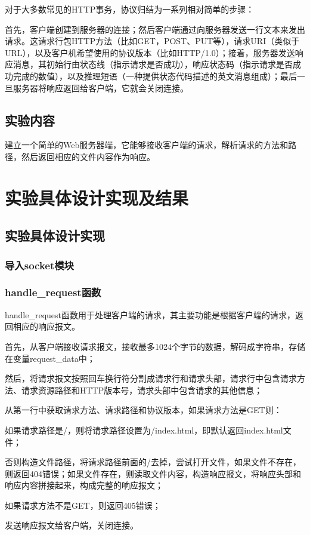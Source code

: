 \documentclass[UTF8,12pt]{article}
\begin{document}
对于大多数常见的HTTP事务，协议归结为一系列相对简单的步骤：

首先，客户端创建到服务器的连接；然后客户端通过向服务器发送一行文本来发出请求。这请求行包HTTP方法（比如GET，POST、PUT等），请求URI（类似于URL），以及客户机希望使用的协议版本（比如HTTP/1.0）；接着，服务器发送响应消息，其初始行由状态线（指示请求是否成功），响应状态码（指示请求是否成功完成的数值），以及推理短语（一种提供状态代码描述的英文消息组成）；最后一旦服务器将响应返回给客户端，它就会关闭连接。

\subsection{实验内容}
建立一个简单的Web服务器端，它能够接收客户端的请求，解析请求的方法和路径，然后返回相应的文件内容作为响应。
\section{实验具体设计实现及结果}
\subsection{实验具体设计实现}
\subsubsection{导入socket模块}
\subsubsection{handle\_request函数}
handle\_request函数用于处理客户端的请求，其主要功能是根据客户端的请求，返回相应的响应报文。

首先，从客户端接收请求报文，接收最多1024个字节的数据，解码成字符串，存储在变量request\_data中；

然后，将请求报文按照回车换行符分割成请求行和请求头部，请求行中包含请求方法、请求资源路径和HTTP版本号，请求头部中包含请求的其他信息；

从第一行中获取请求方法、请求路径和协议版本，如果请求方法是GET则：

如果请求路径是/，则将请求路径设置为/index.html，即默认返回index.html文件；

否则构造文件路径，将请求路径前面的/去掉，尝试打开文件，如果文件不存在，则返回404错误；如果文件存在，则读取文件内容，构造响应报文，将响应头部和响应内容拼接起来，构成完整的响应报文；

如果请求方法不是GET，则返回405错误；

发送响应报文给客户端，关闭连接。
\end{document}
